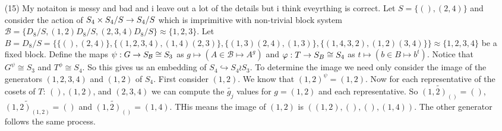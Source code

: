 \documentclass[12pt]{amsart}
\begin{document}
\begin{itemize}
\begin{enumerate}[label= (\alph*)]
   \end{enumerate}
   \item[(15)] My notaiton is messy and bad and i leave out a lot of the details but i think eveyrthing is correct. Let $S=\{(), (2,4)\}$ and consider the action of $S_4\times S_4/S\rightarrow S_4/S$ which is imprimitive 
   with non-trivial block system $\mathcal B=\{D_8/S,(1,2)D_8/S,(2,3,4)D_8/S\}\approx\{1,2,3\}$.
   Let $B=D_8/S=\{\{(),(2,4)\},\{(1,2,3,4),(1,4)(2,3)\},\{(1,3)(2,4),(1,3)\},\{(1,4,3,2),(1,2)(3,4)\}\}\approx\{1,2,3,4\}$ be a fixed block. 
   Define the maps $\psi:G\rightarrow S_{\mathcal B}\cong S_3$ as 
   $g\mapsto (A\in\mathcal B\mapsto A^g)$ and $\varphi:T\rightarrow S_{B}\cong S_4$ as 
   $t\mapsto (b\in B\mapsto b^t)$. Notice that $G^\psi\cong S_3$ and $T^\phi\cong S_4$.
   So this gives us an embedding of $S_4\hookrightarrow S_4\wr S_3$. To determine the image we need
   only consider the image of the generators $(1,2,3,4)$ and $(1,2)$ of $S_4$.
   First consider $(1,2)$. We know that $(1,2)^\psi=(1,2)$. Now for each representative 
   of the cosets of $T$: $(),(1,2)$, and $(2,3,4)$ we can compute the $\tilde{g_j}$ values 
   for $g=(1,2)$ and each representative. So $\tilde{(1,2)_{()}}=()$, $\tilde{(1,2)_{(1,2)}}=()$ and $\tilde{(1,2)_{()}}=(1,4)$.
   THis means the image of $(1,2)$ is $((1,2),(),(),(1,4))$. The other generator follows the same process.
\end{itemize}
\end{document}
